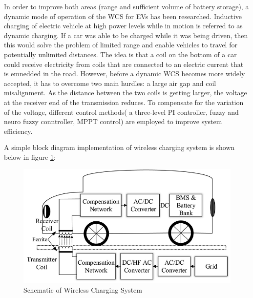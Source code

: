 \documentclass[12pt]{article}
\begin{document}
In order to improve both areas (range and sufficient volume of battery storage), a dynamic mode of operation of the WCS for EVs has been researched. Inductive charging of electric vehicle at high power levels while in motion is referred to as dynamic charging. If a car was able to be charged while it was being driven, then this would solve the problem of limited range and enable vehicles to travel for potentially unlimited distances. The idea is that a coil on the bottom of a car could receive electricity from coils that are connected to an electric current that is emnedded in the road. However, before a dynamic WCS becomes more widely accepted, it has to overcome two main hurdles: a large air gap and coil misalignment. As the distance between the two coils is getting larger, the voltage at the receiver end of the transmission reduces. To compensate for the variation of the voltage, different control methods( a three-level PI controller, fuzzy and neuro fuzzy conntroller, MPPT control) are employed to improve system efficiency. 

A simple block diagram implementation of wireless charging system is shown below in figure \ref{fig:scheme}:
\begin{figure}[h!]
	\centering
	\includegraphics[scale=0.5]{image1.jpg}
	\caption{Schematic of Wireless Charging System}
	\label{fig:scheme}
\end{figure}
\newpage
\end{document}
